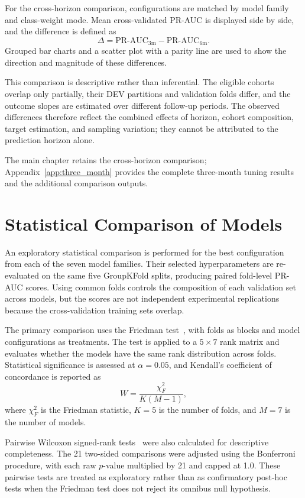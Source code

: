 For the cross-horizon comparison, configurations are matched by model family and class-weight mode. Mean cross-validated \gls{PR-AUC} is displayed side by side, and the difference is defined as
\[
\Delta = \text{PR-AUC}_{3\text{m}} - \text{PR-AUC}_{6\text{m}}.
\]
Grouped bar charts and a scatter plot with a parity line are used to show the direction and magnitude of these differences.

This comparison is descriptive rather than inferential. The eligible cohorts overlap only partially, their DEV partitions and validation folds differ, and the outcome slopes are estimated over different follow-up periods. The observed differences therefore reflect the combined effects of horizon, cohort composition, target estimation, and sampling variation; they cannot be attributed to the prediction horizon alone.

The main chapter retains the cross-horizon comparison; Appendix~\ref{app:three_month} provides the complete three-month tuning results and the additional comparison outputs.

\section{Statistical Comparison of Models}
\label{sec:methods_statistical_comparison}
An exploratory statistical comparison is performed for the best configuration from each of the seven model families. Their selected hyperparameters are re-evaluated on the same five GroupKFold splits, producing paired fold-level \gls{PR-AUC} scores. Using common folds controls the composition of each validation set across models, but the scores are not independent experimental replications because the cross-validation training sets overlap.

The primary comparison uses the Friedman test~\cite{friedman1937ranks}, with folds as blocks and model configurations as treatments. The test is applied to a $5 \times 7$ rank matrix and evaluates whether the models have the same rank distribution across folds. Statistical significance is assessed at $\alpha=0.05$, and Kendall's coefficient of concordance is reported as
\[
W = \frac{\chi^2_F}{K(M-1)},
\]
where $\chi^2_F$ is the Friedman statistic, $K=5$ is the number of folds, and $M=7$ is the number of models.

Pairwise Wilcoxon signed-rank tests~\cite{wilcoxon1945} were also calculated for descriptive completeness. The 21 two-sided comparisons were adjusted using the Bonferroni procedure, with each raw $p$-value multiplied by 21 and capped at 1.0. These pairwise tests are treated as exploratory rather than as confirmatory post-hoc tests when the Friedman test does not reject its omnibus null hypothesis.

